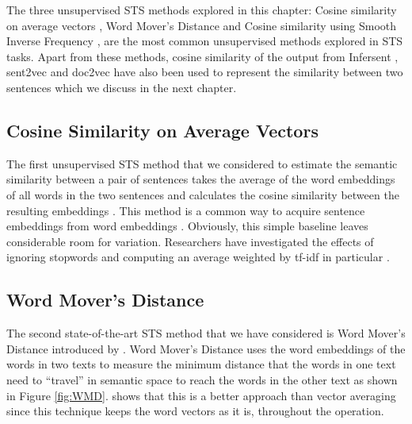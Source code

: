 The three unsupervised STS methods explored in this chapter: Cosine similarity on average vectors \autocite{mitchell-lapata-2008-vector}, Word Mover's Distance \autocite{10.5555/3045118.3045221} and Cosine similarity using Smooth Inverse Frequency \autocite{DBLP:conf/iclr/AroraLM17}, are the most common unsupervised methods explored in STS tasks. Apart from these methods, cosine similarity of the output from Infersent \autocite{conneau-EtAl:2017:EMNLP2017}, sent2vec \autocite{pagliardini-etal-2018-unsupervised} and doc2vec \autocite{pmlr-v32-le14} have also been used to represent the similarity between two sentences which we discuss in the next chapter. 


\subsection{Cosine Similarity on Average Vectors}
The first unsupervised STS method that we considered to estimate the semantic similarity between a pair of sentences takes the average of the word embeddings of all words in the two sentences and calculates the cosine similarity between the resulting embeddings \autocite{mitchell-lapata-2008-vector}. This method is a common way to acquire sentence embeddings from word embeddings \autocite{orasan-2018-aggressive}. Obviously, this simple baseline leaves considerable room for variation. Researchers have investigated the effects of ignoring stopwords and computing an average weighted by tf-idf in particular \autocite{j.1551-6709.2010.01106.x}.

\subsection{Word Mover's Distance}
The second state-of-the-art STS method that we have considered is Word Mover's Distance introduced by \textcite{10.5555/3045118.3045221}. Word Mover's Distance uses the word embeddings of the words in two texts to measure the minimum distance that the words in one text need to ``travel'' in semantic space to reach the words in the other text as shown in Figure \ref{fig:WMD}. \cite{10.5555/3045118.3045221} shows that this is a better approach than vector averaging since this technique keeps the word vectors as it is, throughout the operation.

